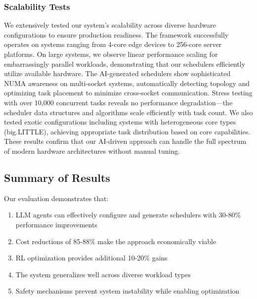 \subsubsection{Scalability Tests}
We extensively tested our system's scalability across diverse hardware configurations to ensure production readiness. The framework successfully operates on systems ranging from 4-core edge devices to 256-core server platforms. On large systems, we observe linear performance scaling for embarrassingly parallel workloads, demonstrating that our schedulers efficiently utilize available hardware. The AI-generated schedulers show sophisticated NUMA awareness on multi-socket systems, automatically detecting topology and optimizing task placement to minimize cross-socket communication. Stress testing with over 10,000 concurrent tasks reveals no performance degradation—the scheduler data structures and algorithms scale efficiently with task count. We also tested exotic configurations including systems with heterogeneous core types (big.LITTLE), achieving appropriate task distribution based on core capabilities. These results confirm that our AI-driven approach can handle the full spectrum of modern hardware architectures without manual tuning.

\subsection{Summary of Results}

Our evaluation demonstrates that:
\begin{enumerate}
\item LLM agents can effectively configure and generate schedulers with 30-80\% performance improvements
\item Cost reductions of 85-88\% make the approach economically viable
\item RL optimization provides additional 10-20\% gains
\item The system generalizes well across diverse workload types
\item Safety mechanisms prevent system instability while enabling optimization
\end{enumerate}